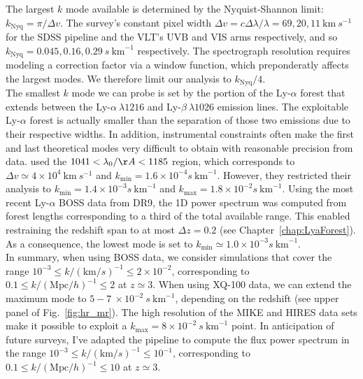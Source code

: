 The largest $k$ mode available is determined by the Nyquist-Shannon limit: $k_{\mathrm{Nyq}} = \pi / \Delta v$. The survey's constant pixel width $\Delta v = c \Delta \lambda / \lambda = 69, 20, 11~\mathrm{km}~s^{-1}$ for the SDSS pipeline \citep{Bolton2012} and the VLT's UVB and VIS arms respectively, and so $k_{\mathrm{Nyq}} = 0.045, 0.16, 0.29 ~s~\mathrm{km}^{-1}$ respectively. The spectrograph resolution requires modeling a correction factor via a window function, which preponderatly affects the largest modes. We therefore limit our analysis to $k_{\mathrm{Nyq}}/4$. \\

The smallest $k$ mode we can probe is set by the portion of the Ly-$\alpha$ forest that extends between the Ly-$\alpha~\lambda1216$ and Ly-$\beta~\lambda1026$ emission lines. The exploitable Ly-$\alpha$ forest is actually smaller than the separation of those two emissions due to their respective widths. In addition, instrumental constraints often make the first and last theoretical modes very difficult to obtain with reasonable precision from data. \citet{McDonald2006} used the $1041 < \lambda_0/\AA < 1185$ region, which corresponds to $\Delta v \simeq 4 \times 10^4~\mathrm{km}~s^{-1}$ and $k_{\mathrm{min}} = 1.6 \times 10^{-4} s~\mathrm{km}^{-1}$. However, they restricted their analysis to $k_{\mathrm{min}} = 1.4 \times 10^{-3} s~\mathrm{km}^{-1}$ and $k_{\mathrm{max}} = 1.8 \times 10^{-2} s~\mathrm{km}^{-1}$. Using the most recent Ly-$\alpha$ BOSS data from DR9, the 1D power spectrum was computed from forest lengths corresponding to a third of the total available range. This enabled restraining the redshift span to at most $\Delta z=0.2$ (see Chapter~\ref{chap:LyaForest}). As a consequence,  the lowest mode is set to $k_{\mathrm{min}} \simeq 1.0 \times 10^{-3} s~\mathrm{km}^{-1}$. \\

In summary, when using BOSS data, we consider simulations that cover the range $10^{-3} \leqslant k / (\mathrm{km}/s)^{-1} \leqslant 2 \times 10^{-2}$, corresponding to $0.1 \leqslant k / (\mathrm{Mpc}/h)^{-1} \leqslant 2$ at $z \simeq 3$. When using XQ-100 data, we can extend the maximum mode to $5-7~\times 10^{-2}~s~\mathrm{km}^{-1}$, depending on the redshift (see upper panel of Fig.~\ref{fig:hr_mr}). The high resolution of the MIKE and HIRES data sets make it possible to exploit a $k_{\mathrm{max}} = 8 \times 10^{-2} ~s~\mathrm{km}^{-1}$ point. In anticipation of future surveys, I've adapted the pipeline to compute the flux power spectrum in the range $10^{-3} \leqslant k / (\mathrm{km}/s)^{-1} \leqslant 10^{-1}$, corresponding to $0.1 \leqslant k / (\mathrm{Mpc}/h)^{-1} \leqslant 10$ at $z \simeq 3$. \\

